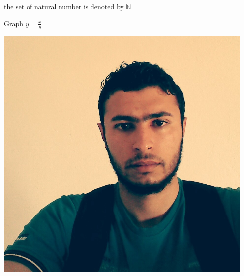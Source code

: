 \documentclass[12pt]{article}
\def\eq1{y=\frac{x}{y}}
\begin{document}
the set of natural number is denoted by $\mathbb{N}$

Graph $\eq1$


\begin{center}

 \includegraphics[width=5in]{2.jpg}
 \end{center}
\end{document}
